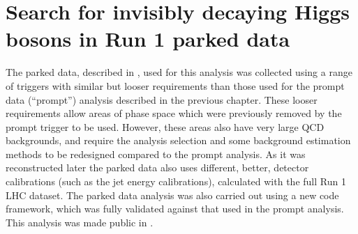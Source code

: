 \chapter{Search for invisibly decaying Higgs bosons in Run 1 parked data}
\label{chap:parked}
The parked data, described in , used for this analysis was collected using a range of triggers with similar but looser requirements than those used for the prompt data (``prompt'') analysis described in the previous chapter. These looser requirements allow areas of phase space which were previously removed by the prompt trigger to be used. However, these areas also have very large \ac{QCD} backgrounds, and require the analysis selection 
and some background estimation methods to be redesigned compared to the prompt analysis. As it was reconstructed later the parked data also uses different, better, detector calibrations (such as the jet energy calibrations), calculated with the full Run 1 LHC dataset. The parked data analysis was also carried out using a new code framework, which was fully validated against that used in the prompt analysis. This analysis was made public in .%


